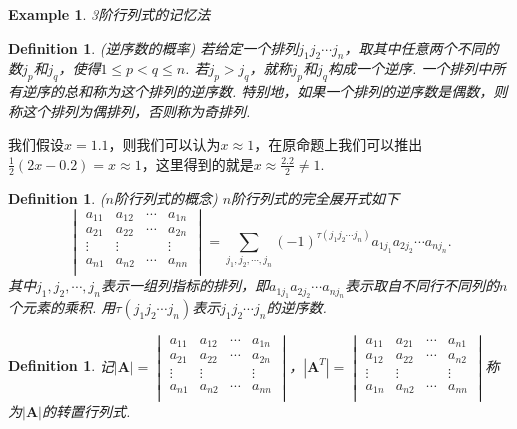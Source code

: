 \documentclass{article}
\newtheorem{example}[theorem]{Example}
\newtheorem{definition}[theorem]{Definition}
\newcommand{\mbf}[1]{\bm{#1}}
\begin{document}
\begin{example}
\rm 3阶行列式的记忆法
\end{example}

\begin{definition}
\rm {\color{red} (逆序数的概率)} 若给定一个排列$j_1j_2\cdots j_n$，取其中任意两个不同的数$j_p$和$j_q$，使得$1 \leq p< q \leq n$. 若$j_p > j_q$，就称$j_p$和$j_q$构成一个{\color{red}逆序}. 一个排列中所有逆序的总和称为这个排列的{\color{red}逆序数}. 特别地，如果一个排列的逆序数是偶数，则称这个排列为{\color{red}偶排列}，否则称为{\color{red}奇排列}.
\end{definition}

我们假设$x = 1.1$，则我们可以认为$x \approx 1$，在原命题上我们可以推出$\frac{1}{2}(2x - 0.2)= x \approx 1$，这里得到的就是$x \approx 
\frac{2.2}{2} \neq 1$. 


\begin{definition}
\rm {\color{red} ($n$阶行列式的概念)} $n$阶行列式的{\color{red}完全展开式}如下
$$
\begin{vmatrix}
a_{11} & a_{12} & \cdots & a_{1n} \\
a_{21} & a_{22} & \cdots & a_{2n} \\
\vdots & \vdots & 		 & \vdots \\
a_{n1} & a_{n2} & \cdots & a_{nn} \\
\end{vmatrix}
=\sum\limits_{j_1,j_2,\cdots,j_n} (-1)^{\tau(j_1j_2\cdots j_n)} a_{1j_1}a_{2j_2}\cdots a_{nj_n}.
$$
其中$j_1,j_2,\cdots,j_n$表示一组列指标的排列，即$a_{1j_1}a_{2j_2}\cdots a_{nj_n}$表示取自不同行不同列的$n$个元素的乘积. 用$\tau(j_1j_2\cdots j_n)$表示$j_1j_2\cdots j_n$的逆序数.  
\end{definition}

\begin{definition}
\rm 记$|\mathbf{A}| = \begin{vmatrix}
a_{11} & a_{12} & \cdots & a_{1n} \\
a_{21} & a_{22} & \cdots & a_{2n} \\
\vdots & \vdots & 		 & \vdots \\
a_{n1} & a_{n2} & \cdots & a_{nn} \\
\end{vmatrix}$，$|\mathbf{A}^T| = \begin{vmatrix}
a_{11} & a_{21} & \cdots & a_{n1} \\
a_{12} & a_{22} & \cdots & a_{n2} \\
\vdots & \vdots & 		 & \vdots \\
a_{1n} & a_{n2} & \cdots & a_{nn} \\
\end{vmatrix}$称为$|\mbf{A}|$的{\color{red}转置行列式}.
\end{definition}
\end{document}
